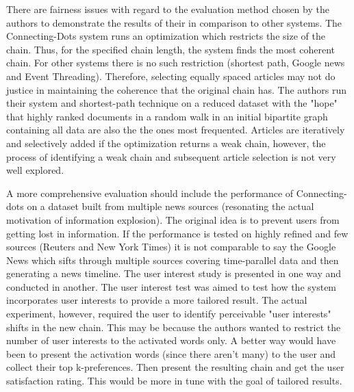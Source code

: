\documentclass[10pt]{article}
\begin{document}
\par There are fairness issues with regard to the evaluation method chosen by the authors to demonstrate the results of their in comparison to other systems. The Connecting-Dots system runs an optimization which restricts the size of the chain. Thus, for the specified chain length, the system finds the most coherent chain. For other systems there is no such restriction (shortest path, Google news and Event Threading). Therefore, selecting equally spaced articles may not do justice in maintaining the coherence that the original chain has. The authors run their system and shortest-path technique on a reduced dataset with the "hope" that highly ranked documents in a random walk in an initial bipartite graph containing all data are also the the ones most frequented. Articles are iteratively and selectively added if the optimization returns a weak chain, however, the process of identifying a weak chain and subsequent article selection is not very well explored. 

\par A more comprehensive evaluation should include the performance of Connecting-dots on a dataset built from multiple news sources (resonating the actual motivation of information explosion). The original idea is to prevent users from getting lost in information. If the performance is tested on highly refined and few sources (Reuters and New York Times) it is not comparable to say the Google News which sifts through multiple sources covering time-parallel data and then generating a news timeline. The user interest study is presented in one way and conducted in another. The user interest test was aimed to test how the system incorporates user interests to provide a more tailored result. The actual experiment, however, required the user to identify perceivable "user interests" shifts in the new chain. This may be because the authors wanted to restrict the number of user interests to the activated words only. A better way would have been to present the activation words (since there aren't many) to the user and collect their top k-preferences. Then present the resulting chain and get the user satisfaction rating. This would be more in tune with the goal of tailored results. 
\end{document}
